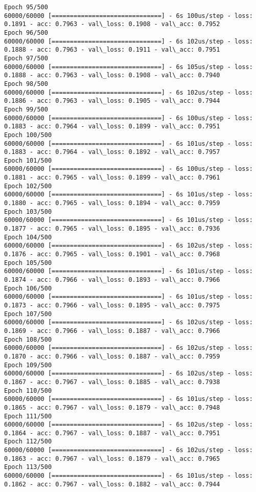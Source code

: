 \documentclass[11pt]{article}
\begin{document}
\begin{Verbatim}[commandchars=\\\{\}]
Epoch 95/500
60000/60000 [==============================] - 6s 100us/step - loss: 0.1891 - acc: 0.7963 - val\_loss: 0.1908 - val\_acc: 0.7952
Epoch 96/500
60000/60000 [==============================] - 6s 102us/step - loss: 0.1888 - acc: 0.7963 - val\_loss: 0.1911 - val\_acc: 0.7951
Epoch 97/500
60000/60000 [==============================] - 6s 105us/step - loss: 0.1888 - acc: 0.7963 - val\_loss: 0.1908 - val\_acc: 0.7940
Epoch 98/500
60000/60000 [==============================] - 6s 102us/step - loss: 0.1886 - acc: 0.7963 - val\_loss: 0.1905 - val\_acc: 0.7944
Epoch 99/500
60000/60000 [==============================] - 6s 100us/step - loss: 0.1883 - acc: 0.7964 - val\_loss: 0.1899 - val\_acc: 0.7951
Epoch 100/500
60000/60000 [==============================] - 6s 101us/step - loss: 0.1883 - acc: 0.7964 - val\_loss: 0.1892 - val\_acc: 0.7957
Epoch 101/500
60000/60000 [==============================] - 6s 100us/step - loss: 0.1881 - acc: 0.7965 - val\_loss: 0.1899 - val\_acc: 0.7961
Epoch 102/500
60000/60000 [==============================] - 6s 101us/step - loss: 0.1880 - acc: 0.7965 - val\_loss: 0.1894 - val\_acc: 0.7959
Epoch 103/500
60000/60000 [==============================] - 6s 101us/step - loss: 0.1877 - acc: 0.7965 - val\_loss: 0.1895 - val\_acc: 0.7936
Epoch 104/500
60000/60000 [==============================] - 6s 102us/step - loss: 0.1876 - acc: 0.7965 - val\_loss: 0.1901 - val\_acc: 0.7968
Epoch 105/500
60000/60000 [==============================] - 6s 101us/step - loss: 0.1874 - acc: 0.7966 - val\_loss: 0.1893 - val\_acc: 0.7966
Epoch 106/500
60000/60000 [==============================] - 6s 101us/step - loss: 0.1873 - acc: 0.7966 - val\_loss: 0.1895 - val\_acc: 0.7975
Epoch 107/500
60000/60000 [==============================] - 6s 102us/step - loss: 0.1869 - acc: 0.7966 - val\_loss: 0.1887 - val\_acc: 0.7966
Epoch 108/500
60000/60000 [==============================] - 6s 102us/step - loss: 0.1870 - acc: 0.7966 - val\_loss: 0.1887 - val\_acc: 0.7959
Epoch 109/500
60000/60000 [==============================] - 6s 102us/step - loss: 0.1867 - acc: 0.7967 - val\_loss: 0.1885 - val\_acc: 0.7938
Epoch 110/500
60000/60000 [==============================] - 6s 101us/step - loss: 0.1865 - acc: 0.7967 - val\_loss: 0.1879 - val\_acc: 0.7948
Epoch 111/500
60000/60000 [==============================] - 6s 102us/step - loss: 0.1864 - acc: 0.7967 - val\_loss: 0.1887 - val\_acc: 0.7951
Epoch 112/500
60000/60000 [==============================] - 6s 102us/step - loss: 0.1863 - acc: 0.7967 - val\_loss: 0.1879 - val\_acc: 0.7965
Epoch 113/500
60000/60000 [==============================] - 6s 101us/step - loss: 0.1862 - acc: 0.7967 - val\_loss: 0.1882 - val\_acc: 0.7944

\end{Verbatim}
\end{document}
